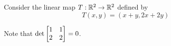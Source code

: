 \begin{example}
    Consider the linear map $T: \mathbb{R}^2 \to \mathbb{R}^2$ defined by $$T(x,y) = (x+y, 2x+2y)$$

    Note that $\textnormal{det} 
\begin{bmatrix}
1 & 1 \\
2 & 2 \\
\end{bmatrix} = 0$.

    
    

 












\end{example}




